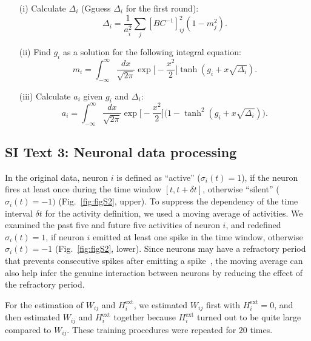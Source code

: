 \documentclass[prx,twocolumn,twoside,showpacs,superscriptaddress]{revtex4-1}
\begin{document}
\begin{itemize}
\item[(i)] Calculate $\Delta_i$ (Gguess $\Delta_i$ for the first round):
\begin{equation}
\Delta_i = \frac{1}{a_i^2} \sum_j [BC^{-1}]_{ij}^2 (1-m_j^2).
\end{equation}
\item[(ii)] Find $g_i$ as a solution for the following integral equation:
\begin{equation}
m_i = \int_{-\infty}^{\infty} \frac{dx}{\sqrt{2 \pi}} \exp \bigg[-\frac{x^2}{2} \bigg] \tanh (g_i + x \sqrt{\Delta_i}).
\end{equation} 
\item[(iii)] Calculate $a_i$ given $g_i$ and $\Delta_i$:
\begin{equation}
a_i = \int_{-\infty}^{\infty} \frac{dx}{\sqrt{2 \pi}} \exp \bigg[-\frac{x^2}{2} \bigg] \big( 1 - \tanh^2 (g_i + x \sqrt{\Delta_i}) \big).
\end{equation}
\end{itemize}

\bigskip
\subsection*{SI Text 3: Neuronal data processing}
In the original data, neuron $i$ is defined as ``active'' ($\sigma_i(t) = 1$), if the neuron fires at least once during the time window $[t, t+\delta t]$, otherwise ``silent'' ($\sigma_i(t)=-1)$ (Fig.~\ref{fig:figS2}, upper).
To suppress the dependency of the time interval $\delta t$ for the activity definition, we used a moving average of activities.
We examined the past five and future five activities of neuron $i$, and redefined $\sigma_i(t)=1$, if neuron $i$ emitted at least one spike in the time window, otherwise $\sigma_i(t)=-1$ (Fig.~\ref{fig:figS2}, lower).
Since neurons may have a refractory period that prevents consecutive spikes after emitting a spike~\cite{Kara2000}, the moving average can also help infer the genuine interaction between neurons by reducing the effect of the refractory period.

For the estimation of $W_{ij}$ and $H_i^{\textrm{ext}}$, we estimated $W_{ij}$ first with $H_i^{\textrm{ext}}=0$, and then estimated $W_{ij}$ and $H_i^{\textrm{ext}}$ together because $H_{i}^{\textrm{ext}}$ turned out to be quite large compared to $W_{ij}$.
These training procedures were repeated for $20$ times.
\end{document}
